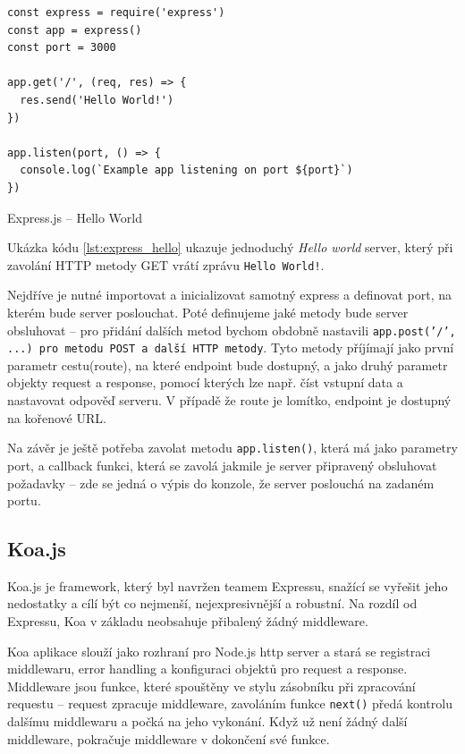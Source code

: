 \documentclass[thesis=M,czech]{FITthesis}[2019/12/23]
\begin{document}
\begin{listing}[H]
\begin{verbatim}
const express = require('express')
const app = express()
const port = 3000

app.get('/', (req, res) => {
  res.send('Hello World!')
})

app.listen(port, () => {
  console.log(`Example app listening on port ${port}`)
})
\end{verbatim}
\caption{Express.js -- Hello World}
\label{lst:express_hello}
\end{listing}

Ukázka kódu \ref{lst:express_hello} ukazuje jednoduchý \textit{Hello world} server, který při zavolání HTTP metody GET vrátí zprávu \texttt{Hello World!}. 

Nejdříve je nutné importovat a inicializovat samotný express a definovat port, na kterém bude server poslouchat. Poté definujeme jaké metody bude server obsluhovat -- pro přidání dalších metod bychom obdobně nastavili \texttt{app.post('/', ...) pro metodu POST a další HTTP metody}. Tyto metody příjímají jako první parametr cestu(route), na které endpoint bude dostupný, a jako druhý parametr objekty request a response, pomocí kterých lze např. číst vstupní data a nastavovat odpověď serveru. V případě že route je lomítko, endpoint je dostupný na kořenové URL.

Na závěr je ještě potřeba zavolat metodu \texttt{app.listen()}, která má jako parametry port, a callback funkci, která se zavolá jakmile je server připravený obsluhovat požadavky -- zde se jedná o výpis do konzole, že server poslouchá na zadaném portu.

\subsection*{Koa.js}
Koa.js je framework, který byl navržen teamem Expressu, snažící se vyřešit jeho nedostatky a cílí být co nejmenší, nejexpresivnější a robustní. Na rozdíl od Expressu, Koa v základu neobsahuje přibalený žádný middleware.

Koa aplikace slouží jako rozhraní pro Node.js http server a stará se registraci middlewaru, error handling a konfiguraci objektů pro request a response.
Middleware jsou funkce, které spouštěny ve stylu zásobníku při zpracování requestu -- request zpracuje middleware, zavoláním funkce \texttt{next()} předá kontrolu dalšímu middlewaru a počká na jeho vykonání. Když už není žádný další middleware, pokračuje middleware v dokončení své funkce.
\end{document}
